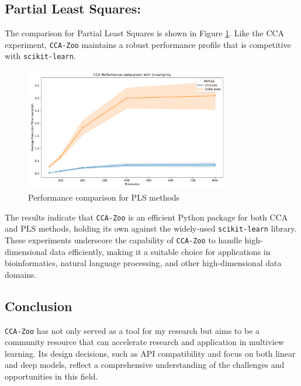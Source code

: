 \subsection{Partial Least Squares:}
The comparison for Partial Least Squares is shown in Figure \ref{fig:pls_benchmark}.
Like the CCA experiment, \texttt{CCA-Zoo} maintains a robust performance profile that is competitive with \texttt{scikit-learn}.

\begin{figure}[h]
    \centering
    \includegraphics[width=0.8\textwidth]{figures/CCA_Speed_Benchmark}
    \caption{Performance comparison for PLS methods}
    \label{fig:pls_benchmark}
\end{figure}

The results indicate that \texttt{CCA-Zoo} is an efficient Python package for both CCA and PLS methods, holding its own against the widely-used \texttt{scikit-learn} library.
These experiments underscore the capability of \texttt{CCA-Zoo} to handle high-dimensional data efficiently, making it a suitable choice for applications in bioinformatics, natural language processing, and other high-dimensional data domains.

\subsection{Conclusion}

\texttt{CCA-Zoo} has not only served as a tool for my research but aims to be a community resource that can accelerate research and application in multiview learning.
Its design decisions, such as API compatibility and focus on both linear and deep models, reflect a comprehensive understanding of the challenges and opportunities in this field.
